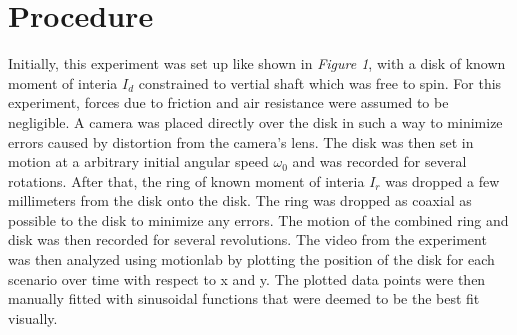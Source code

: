 \documentclass[12pt,letterpaper]{article}
\begin{document}
\section{Procedure}
Initially, this experiment was set up like shown in \textit{Figure 1}, with a disk of known moment of interia \(I_d\) constrained to vertial shaft which was free to spin. For this experiment, forces due to friction and air resistance were assumed to be negligible. A camera was placed directly over the disk in such a way to minimize errors caused by distortion from the camera's lens. The disk was then set in motion at a arbitrary initial angular speed \(\omega_0\) and was recorded for several rotations. After that, the ring of known moment of interia \(I_r\) was dropped a few millimeters from the disk onto the disk. The ring was dropped as coaxial as possible to the disk to minimize any errors. The motion of the combined ring and disk was then recorded for several revolutions. The video from the experiment was then analyzed using motionlab by plotting the position of the disk for each scenario over time with respect to x and y. The plotted data points were then manually fitted with sinusoidal functions that were deemed to be the best fit visually. 
\vspace{0.5in}
\end{document}
